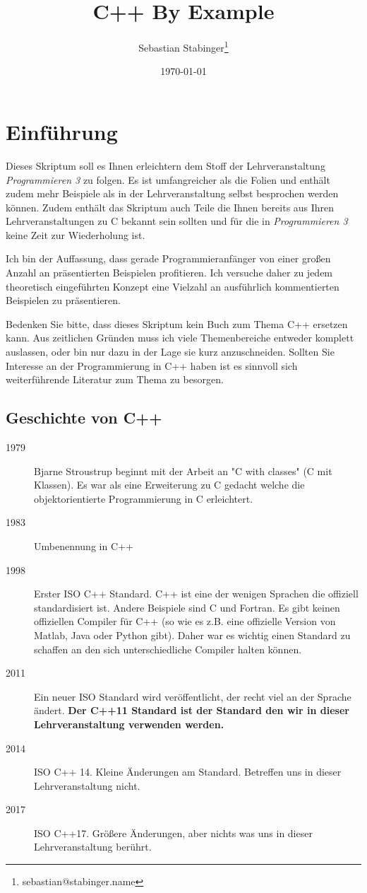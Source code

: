 \documentclass[11pt]{article}
\author{Sebastian Stabinger\thanks{sebastian@stabinger.name}}
\date{\today}
\title{C++ By Example}
\begin{document}
\maketitle
\setcounter{tocdepth}{2}
\tableofcontents


\section{Einführung}
\label{sec-1}
Dieses Skriptum soll es Ihnen erleichtern dem Stoff der
Lehrveranstaltung \emph{Programmieren 3} zu folgen. Es ist umfangreicher
als die Folien und enthält zudem mehr Beispiele als in der
Lehrveranstaltung selbst besprochen werden können. Zudem enthält das
Skriptum auch Teile die Ihnen bereits aus Ihren Lehrveranstaltungen zu
C bekannt sein sollten und für die in \emph{Programmieren 3} keine Zeit zur
Wiederholung ist.

Ich bin der Auffassung, dass gerade Programmieranfänger von einer
großen Anzahl an präsentierten Beispielen profitieren. Ich versuche
daher zu jedem theoretisch eingeführten Konzept eine Vielzahl an
ausführlich kommentierten Beispielen zu präsentieren.

Bedenken Sie bitte, dass dieses Skriptum kein Buch zum Thema C++
ersetzen kann. Aus zeitlichen Gründen muss ich viele Themenbereiche
entweder komplett auslassen, oder bin nur dazu in der Lage sie kurz
anzuschneiden. Sollten Sie Interesse an der Programmierung in C++
haben ist es sinnvoll sich weiterführende Literatur zum Thema zu
besorgen.
\subsection{Geschichte von C++}
\label{sec-1-1}
\begin{description}
\item[{1979}] Bjarne Stroustrup beginnt mit der Arbeit an "C with classes"
(C mit Klassen). Es war als eine Erweiterung zu C gedacht welche
die objektorientierte Programmierung in C erleichtert.
\item[{1983}] Umbenennung in C++
\item[{1998}] Erster ISO C++ Standard. C++ ist eine der wenigen Sprachen
die offiziell standardisiert ist. Andere Beispiele sind C und
Fortran. Es gibt keinen offiziellen Compiler für C++ (so wie es
z.B. eine offizielle Version von Matlab, Java oder Python gibt).
Daher war es wichtig einen Standard zu schaffen an den sich
unterschiedliche Compiler halten können.
\item[{2011}] Ein neuer ISO Standard wird veröffentlicht, der recht viel
an der Sprache ändert. \textbf{Der C++11 Standard ist der Standard den
wir in dieser Lehrveranstaltung verwenden werden.}
\item[{2014}] ISO C++ 14. Kleine Änderungen am Standard. Betreffen uns in
dieser Lehrveranstaltung nicht.
\item[{2017}] ISO C++17. Größere Änderungen, aber nichts was uns in dieser
Lehrveranstaltung berührt.
\end{description}
\end{document}
